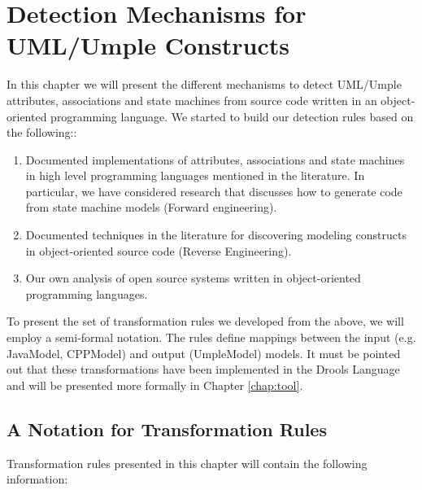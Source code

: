 \lhead{\emph{\leftmark}}  

\chapter{Detection Mechanisms for UML/Umple Constructs}
\label{chap:detections}

In this chapter we will present the different mechanisms to detect UML/Umple attributes, associations and state machines from source code written in an object-oriented programming language. We started to build our detection rules based on the following::

\begin{enumerate}

\item Documented implementations of attributes, associations and state machines in high level programming languages mentioned in the literature. In particular, we have considered research that discusses how to generate code from state machine models (Forward engineering).

\item Documented techniques in the literature for discovering  modeling constructs in object-oriented source code (Reverse Engineering).

\item Our own analysis of open source systems written in object-oriented programming languages.

\end{enumerate}

To present the set of transformation rules we developed from the above, we will employ a semi-formal notation. The rules define mappings between the input (e.g. JavaModel, CPPModel) and output (UmpleModel) models.  It must be pointed out that these transformations have been implemented in the Drools Language and will be presented more formally in Chapter \ref{chap:tool}.

\section{A Notation for Transformation Rules}

Transformation rules presented in this chapter will contain the following information:

